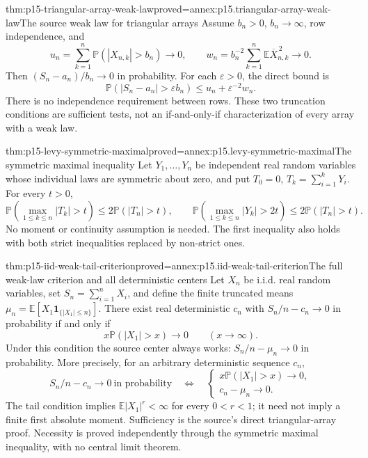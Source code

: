 \begin{hbtheorem}{thm:p15-triangular-array-weak-law}{proved=annex:p15.triangular-array-weak-law}{The source weak law for triangular arrays}
Assume \(b_n>0\), \(b_n\to\infty\), row independence, and
\[
 u_n=\sum_{k=1}^n\mathbb P(|X_{n,k}|>b_n)\longrightarrow0,\qquad
 w_n=b_n^{-2}\sum_{k=1}^n\mathbb E\overline X_{n,k}^{\,2}
                                                 \longrightarrow0.
\]
Then \((S_n-a_n)/b_n\to0\) in probability. For each
\(\varepsilon>0\), the direct bound is
\[
 \mathbb P(|S_n-a_n|>\varepsilon b_n)
                            \leq u_n+\varepsilon^{-2}w_n.
\]
There is no independence requirement between rows. These two
truncation conditions are sufficient tests, not an if-and-only-if
characterization of every array with a weak law.
\end{hbtheorem}

\begin{hblemma}{thm:p15-levy-symmetric-maximal}{proved=annex:p15.levy-symmetric-maximal}{The symmetric maximal inequality}
Let \(Y_1,\ldots,Y_n\) be independent real random variables whose
individual laws are symmetric about zero, and put
\(T_0=0\), \(T_k=\sum_{i=1}^kY_i\). For every \(t>0\),
\[
 \mathbb P\!\left(\max_{1\leq k\leq n}|T_k|>t\right)
          \leq2\mathbb P(|T_n|>t),\qquad
 \mathbb P\!\left(\max_{1\leq k\leq n}|Y_k|>2t\right)
          \leq2\mathbb P(|T_n|>t).
\]
No moment or continuity assumption is needed. The first inequality
also holds with both strict inequalities replaced by non-strict ones.
\end{hblemma}

\begin{hbtheorem}{thm:p15-iid-weak-tail-criterion}{proved=annex:p15.iid-weak-tail-criterion}{The full weak-law criterion and all deterministic centers}
Let \(X_n\) be i.i.d. real random variables, set \(S_n=\sum_{i=1}^nX_i\),
and define the finite truncated means
\(\mu_n=\mathbb E[X_1\mathbf1_{\{|X_1|\leq n\}}]\).
There exist real deterministic \(c_n\) with
\(S_n/n-c_n\to0\) in probability if and only if
\[
 x\mathbb P(|X_1|>x)\longrightarrow0\qquad(x\to\infty).
\]
Under this condition the source center always works:
\(S_n/n-\mu_n\to0\) in probability. More precisely, for an
arbitrary deterministic sequence \(c_n\),
\[
 S_n/n-c_n\longrightarrow0\ \text{in probability}
 \quad\Longleftrightarrow\quad
 \begin{cases}
 x\mathbb P(|X_1|>x)\to0,\\
 c_n-\mu_n\to0.
 \end{cases}
\]
The tail condition implies
\(\mathbb E|X_1|^r<\infty\) for every \(0<r<1\);
it need not imply a finite first absolute moment.
Sufficiency is the source's direct triangular-array proof.
Necessity is proved independently through the symmetric maximal
inequality, with no central limit theorem.
\end{hbtheorem}

